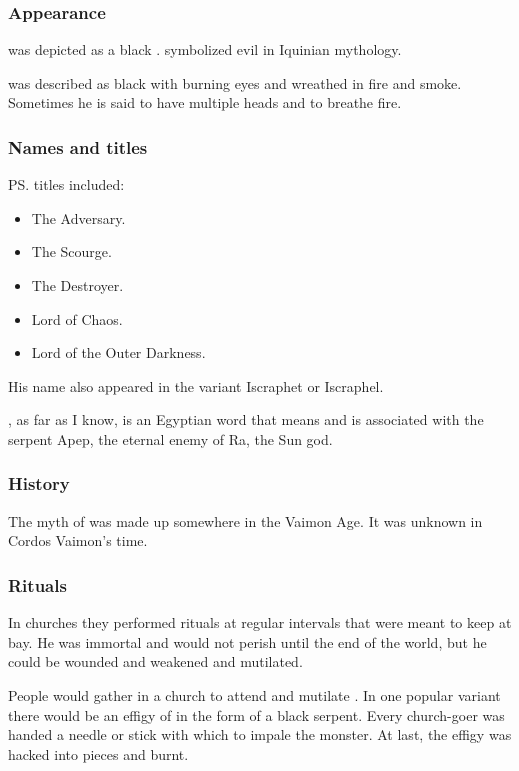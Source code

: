 \subsubsection{Appearance}
\Isphet was depicted as a black \dragon. 
\Dragons symbolized evil in Iquinian mythology.

\Isphet was described as black with burning eyes and wreathed in fire and smoke. 
Sometimes he is said to have multiple heads and to breathe fire. 





\subsubsection{Names and titles}
\ps{\Isphet} titles included:
\begin{itemize}
  \item The Adversary.
  \item The Scourge.
  \item The Destroyer.
  \item Lord of Chaos.
  \item Lord of the Outer Darkness.
\end{itemize}

His name also appeared in the variant Iscraphet or Iscraphel. 

, as far as I know, is an Egyptian word that means  and is associated with the serpent Apep, the eternal enemy of Ra, the Sun god. 






\subsubsection{History}
The myth of \Isphet was made up somewhere in the Vaimon Age. 
It was unknown in Cordos Vaimon's time. 





\subsubsection{Rituals}
In churches they performed rituals at regular intervals that were meant to keep \Isphet at bay.
He was immortal and would not perish until the end of the world, but he could be wounded and weakened and mutilated.

People would gather in a church to attend  and mutilate \Isphet. 
In one popular variant there would be an effigy of \Isphet in the form of a black serpent. 
Every church-goer was handed a needle or stick with which to impale the monster. 
At last, the effigy was hacked into pieces and burnt. 





